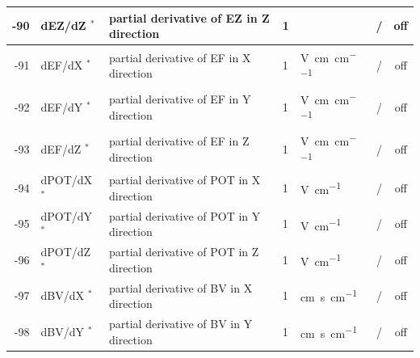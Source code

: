 \begin{landscape}
\begin{longtable}{|r|l|l|l|l|c|c|}
    -90                    & dEZ/dZ $^*$
                           & partial derivative of EZ in Z direction
                           & 1                            & 
			   & /              & off         
    \\ \hline
    -91                    & dEF/dX $^*$
                           & partial derivative of EF in X direction
                           & 1                            & \si{\volt\per\centi\metre\per\centi\metre}
			   & /              & off         
    \\ \hline
    -92                    & dEF/dY $^*$
                           & partial derivative of EF in Y direction
                           & 1                            & \si{\volt\per\centi\metre\per\centi\metre}
			   & /              & off         
    \\ \hline
    -93                    & dEF/dZ $^*$
                           & partial derivative of EF in Z direction
                           & 1                            & \si{\volt\per\centi\metre\per\centi\metre}
			   & /               & off        
    \\ \hline
    -94                    & dPOT/dX $^*$
                           & partial derivative of POT in X direction
                           & 1                            & \si{\volt\per\centi\metre}
			   & /              & off         
    \\ \hline
    -95                    & dPOT/dY $^*$
                           & partial derivative of POT in Y direction
                           & 1                            & \si{\volt\per\centi\metre}
			   & /              & off         
    \\ \hline
    -96                    & dPOT/dZ $^*$
                           & partial derivative of POT in Z direction
                           & 1                            & \si{\volt\per\centi\metre}
			   & /              & off         
    \\ \hline
    -97                    & dBV/dX $^*$
                           & partial derivative of BV in X direction  
                           & 1                            & \si{\centi\metre\second\per\centi\metre}
			   & /              & off         
    \\ \hline
    -98                    & dBV/dY $^*$
                           & partial derivative of BV in Y direction  
                           & 1                            & \si{\centi\metre\second\per\centi\metre}
			   & /              & off         

\end{longtable}
\end{landscape}
